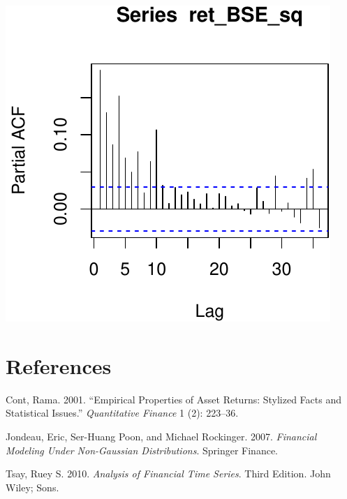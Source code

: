 \documentclass[11pt,]{article}
\begin{document}
\begin{center}\includegraphics{FMC_T4_PhD_ARMA_GARCH_files/figure-latex/BSE_fit_ARMA_GARCH-4} \end{center}

\section*{References}\label{references}

\hypertarget{refs}{}
\hypertarget{ref-Cont:2001}{}
Cont, Rama. 2001. ``Empirical Properties of Asset Returns: Stylized
Facts and Statistical Issues.'' \emph{Quantitative Finance} 1 (2):
223--36.

\hypertarget{ref-Jondeau_Poon_Rockinger:2007}{}
Jondeau, Eric, Ser-Huang Poon, and Michael Rockinger. 2007.
\emph{Financial Modeling Under Non-Gaussian Distributions}. Springer
Finance.

\hypertarget{ref-Tsay:2010}{}
Tsay, Ruey S. 2010. \emph{Analysis of Financial Time Series}. Third
Edition. John Wiley; Sons.
\end{document}
